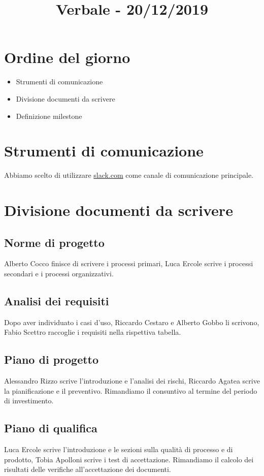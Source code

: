 \documentclass{article}
\title{Verbale - 20/12/2019} %
\newcommand{\commons}{../../commons}
\begin{document}
\section{Ordine del giorno}
\label{sec:ordine_del_giorno}
\begin{itemize}
  \item Strumenti di comunicazione
  \item Divisione documenti da scrivere
  \item Definizione milestone
\end{itemize}
\section{Strumenti di comunicazione}
\label{sec:strumenti_di_comunicazione}
Abbiamo scelto di utilizzare \href{Slack}{slack.com} come canale di comunicazione principale.
\section{Divisione documenti da scrivere}
\label{sec:divisione_documenti_da_scrivere}
\subsection{Norme di progetto}
\label{sub:norme_di_progetto}
Alberto Cocco finisce di scrivere i processi primari, Luca Ercole scrive i processi secondari e i processi organizzativi.
\subsection{Analisi dei requisiti}
\label{sub:analisi_dei_requisiti}
Dopo aver individuato i casi d'uso, Riccardo Cestaro e Alberto Gobbo li scrivono, Fabio Scettro raccoglie i requisiti nella rispettiva tabella.
\subsection{Piano di progetto}
\label{sub:piano_di_progetto}
Alessandro Rizzo scrive l'introduzione e l'analisi dei rischi, Riccardo Agatea scrive la pianificazione e il preventivo. Rimandiamo il consuntivo al termine del periodo di investimento.
\subsection{Piano di qualifica}
\label{sub:piano_di_qualifica}
Luca Ercole scrive l'introduzione e le sezioni sulla qualità di processo e di prodotto, Tobia Apolloni scrive i test di accettazione. Rimandiamo il calcolo dei risultati delle verifiche all'accettazione dei documenti.
\end{document}
